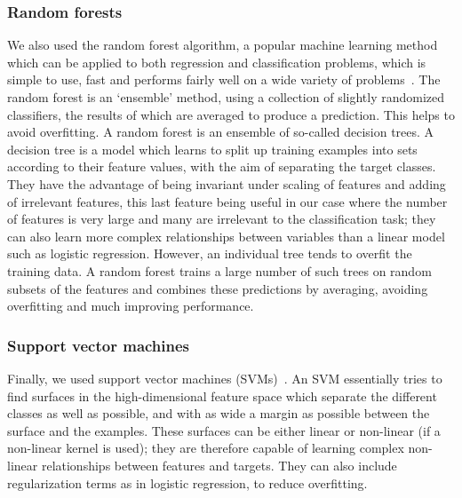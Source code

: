 \documentclass[10pt,letterpaper]{article}
\begin{document}
\subsubsection*{Random forests}
We also used the random forest algorithm, a popular machine learning method which can be applied to both regression and classification problems, which is simple to use, fast and performs fairly well on a wide variety of problems~\cite{Hastie2009}. The random forest is an `ensemble' method, using a collection of slightly randomized classifiers, the results of which are averaged to produce a prediction. This helps to avoid overfitting. A random forest is an ensemble of so-called decision trees. A decision tree is a model which learns to split up training examples into sets according to their feature values, with the aim of separating the target classes. They have the advantage of being invariant under scaling of features and adding of irrelevant features, this last feature being useful in our case where the number of features is very large and many are irrelevant to the classification task; they can also learn more complex relationships between variables than a linear model such as logistic regression. However, an individual tree tends to overfit the training data. A random forest trains a large number of such trees on random subsets of the features and combines these predictions by averaging, avoiding overfitting and much improving performance. 

\subsubsection*{Support vector machines}
Finally, we used support vector machines (SVMs)~\cite{Hastie2009a}. An SVM essentially tries to find surfaces in the high-dimensional feature space which separate the different classes as well as possible, and with as wide a margin as possible between the surface and the examples. These surfaces can be either linear or non-linear (if a non-linear kernel is used); they are therefore capable of learning complex non-linear relationships between features and targets. They can also include regularization terms as in logistic regression, to reduce overfitting. 
\end{document}
